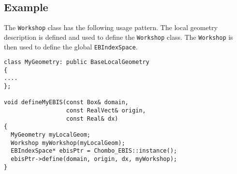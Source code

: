 \subsection{Example}

The {\tt Workshop} class has the following usage pattern.  The 
local geometry description is defined and used to 
define the {\tt Workshop} class.  The {\tt Workshop} is
then used to define the global {\tt EBIndexSpace}.
\begin{small}\begin{verbatim}
class MyGeometry: public BaseLocalGeometry
{
....        
};

void defineMyEBIS(const Box& domain, 
                  const RealVect& origin, 
                  const Real& dx)
{
  MyGeometry myLocalGeom;
  Workshop myWorkshop(myLocalGeom);
  EBIndexSpace* ebisPtr = Chombo_EBIS::instance();
  ebisPtr->define(domain, origin, dx, myWorkshop);         
} 
\end{verbatim}\end{small}
